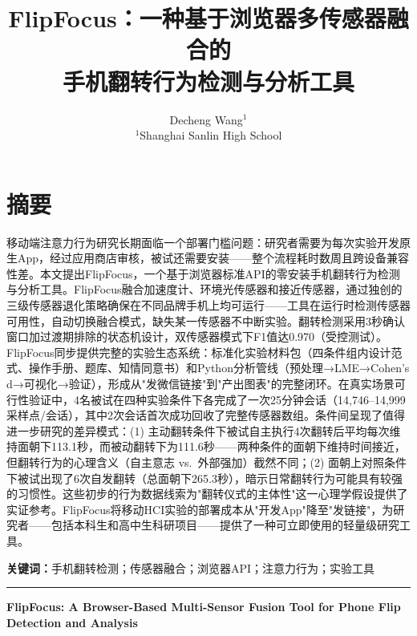 \documentclass[12pt,a4paper]{ctexart}
\title{\textbf{FlipFocus：一种基于浏览器多传感器融合的\\手机翻转行为检测与分析工具}}
\author{
  Decheng Wang$^{1}$ \\
  \small $^{1}$Shanghai Sanlin High School
}
\date{}
\begin{document}
\maketitle

\section*{摘要}

移动端注意力行为研究长期面临一个部署门槛问题：研究者需要为每次实验开发原生App，经过应用商店审核，被试还需要安装——整个流程耗时数周且跨设备兼容性差。本文提出FlipFocus，一个基于浏览器标准API的零安装手机翻转行为检测与分析工具。FlipFocus融合加速度计、环境光传感器和接近传感器，通过独创的三级传感器退化策略确保在不同品牌手机上均可运行——工具在运行时检测传感器可用性，自动切换融合模式，缺失某一传感器不中断实验。翻转检测采用3秒确认窗口加过渡期排除的状态机设计，双传感器模式下F1值达0.970（受控测试）。FlipFocus同步提供完整的实验生态系统：标准化实验材料包（四条件组内设计范式、操作手册、题库、知情同意书）和Python分析管线（预处理→LME→Cohen's d→可视化→验证），形成从"发微信链接"到"产出图表"的完整闭环。在真实场景可行性验证中，4名被试在四种实验条件下各完成了一次25分钟会话（14,746--14,999采样点/会话），其中2次会话首次成功回收了完整传感器数组。条件间呈现了值得进一步研究的差异模式：(1) 主动翻转条件下被试自主执行4次翻转后平均每次维持面朝下113.1秒，而被动翻转下为111.6秒——两种条件的面朝下维持时间接近，但翻转行为的心理含义（自主意志 vs.\ 外部强加）截然不同；(2) 面朝上对照条件下被试出现了6次自发翻转（总面朝下265.3秒），暗示日常翻转行为可能具有较强的习惯性。这些初步的行为数据线索为"翻转仪式的主体性"这一心理学假设提供了实证参考。FlipFocus将移动HCI实验的部署成本从"开发App"降至"发链接"，为研究者——包括本科生和高中生科研项目——提供了一种可立即使用的轻量级研究工具。

\medskip
\noindent\textbf{关键词：}手机翻转检测；传感器融合；浏览器API；注意力行为；实验工具

\medskip
\hrule
\medskip

\noindent\textbf{FlipFocus: A Browser-Based Multi-Sensor Fusion Tool for Phone Flip Detection and Analysis}
\end{document}
